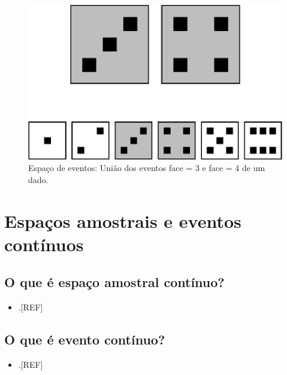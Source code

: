 \documentclass[
  a4paper,
]{book}
\providecommand{\tightlist}{%
  \setlength{\itemsep}{0pt}\setlength{\parskip}{0pt}}
\begin{document}
\begin{figure}

{\centering \includegraphics{Ciencia-com-R_files/figure-latex/espaco-eventos-dado-1} 

}

\caption{Espaço de eventos: União dos eventos face = 3 e face = 4 de um dado.}\label{fig:espaco-eventos-dado}
\end{figure}

\hypertarget{espacos-eventos-continuos}{%
\section{Espaços amostrais e eventos contínuos}\label{espacos-eventos-continuos}}

\hypertarget{o-que-uxe9-espauxe7o-amostral-contuxednuo}{%
\subsection{O que é espaço amostral contínuo?}\label{o-que-uxe9-espauxe7o-amostral-contuxednuo}}

\begin{itemize}
\tightlist
\item
  .{[}REF{]}
\end{itemize}

\hypertarget{o-que-uxe9-evento-contuxednuo}{%
\subsection{O que é evento contínuo?}\label{o-que-uxe9-evento-contuxednuo}}

\begin{itemize}
\tightlist
\item
  .{[}REF{]}
\end{itemize}
\end{document}

